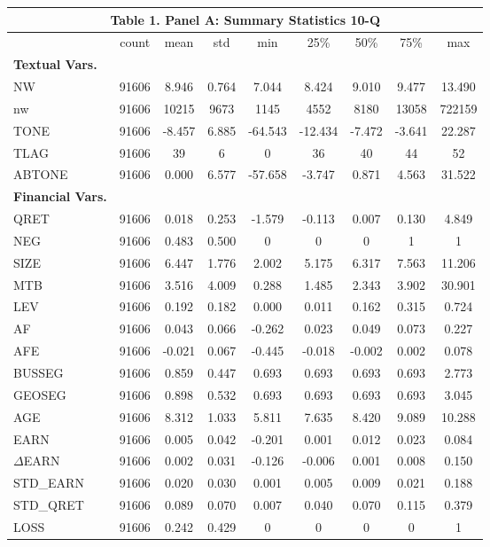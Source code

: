 \begin{table}[htbp] \label{T1PA}
  \centering
    \begin{tabular}{lcccccccc}
    \multicolumn{9}{c}{\textbf{Table 1. Panel A: Summary Statistics 10-Q}} \\
    \midrule
      & count & mean & std & min & 25\% & 50\% & 75\% & max \\
    \midrule
    \textbf{Textual Vars.} &   &   &   &   &   &   &   &  \\
    NW & 91606 & 8.946 & 0.764 & 7.044 & 8.424 & 9.010 & 9.477 & 13.490 \\
    nw & 91606 & 10215 & 9673 & 1145 & 4552 & 8180 & 13058 & 722159 \\
    TONE & 91606 & -8.457 & 6.885 & -64.543 & -12.434 & -7.472 & -3.641 & 22.287 \\
    TLAG & 91606 & 39 & 6 & 0 & 36 & 40 & 44 & 52 \\
    ABTONE & 91606 & 0.000 & 6.577 & -57.658 & -3.747 & 0.871 & 4.563 & 31.522 \\
    \textbf{Financial Vars.} &   &   &   &   &   &   &   &  \\
    QRET & 91606 & 0.018 & 0.253 & -1.579 & -0.113 & 0.007 & 0.130 & 4.849 \\
    NEG & 91606 & 0.483 & 0.500 & 0 & 0 & 0 & 1 & 1 \\
    SIZE & 91606 & 6.447 & 1.776 & 2.002 & 5.175 & 6.317 & 7.563 & 11.206 \\
    MTB & 91606 & 3.516 & 4.009 & 0.288 & 1.485 & 2.343 & 3.902 & 30.901 \\
    LEV & 91606 & 0.192 & 0.182 & 0.000 & 0.011 & 0.162 & 0.315 & 0.724 \\
    AF & 91606 & 0.043 & 0.066 & -0.262 & 0.023 & 0.049 & 0.073 & 0.227 \\
    AFE & 91606 & -0.021 & 0.067 & -0.445 & -0.018 & -0.002 & 0.002 & 0.078 \\
    BUSSEG & 91606 & 0.859 & 0.447 & 0.693 & 0.693 & 0.693 & 0.693 & 2.773 \\
    GEOSEG & 91606 & 0.898 & 0.532 & 0.693 & 0.693 & 0.693 & 0.693 & 3.045 \\
    AGE & 91606 & 8.312 & 1.033 & 5.811 & 7.635 & 8.420 & 9.089 & 10.288 \\
    EARN & 91606 & 0.005 & 0.042 & -0.201 & 0.001 & 0.012 & 0.023 & 0.084 \\
    $\Delta$EARN & 91606 & 0.002 & 0.031 & -0.126 & -0.006 & 0.001 & 0.008 & 0.150 \\
    STD\_EARN & 91606 & 0.020 & 0.030 & 0.001 & 0.005 & 0.009 & 0.021 & 0.188 \\
    STD\_QRET & 91606 & 0.089 & 0.070 & 0.007 & 0.040 & 0.070 & 0.115 & 0.379 \\
    LOSS & 91606 & 0.242 & 0.429 & 0 & 0 & 0 & 0 & 1 \\
    \bottomrule
    \end{tabular}%
\end{table}%
